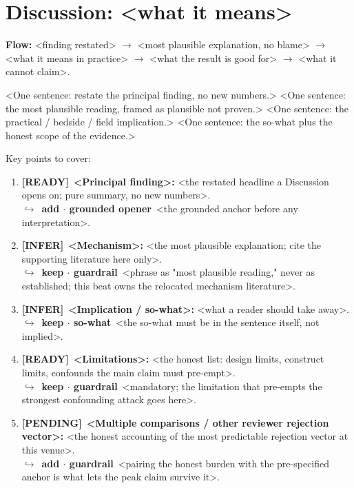 \documentclass[11pt]{article}
\newcommand{\rdy}{\textcolor{cReady}{\textbf{[READY]}}}   %
\newcommand{\pend}{\textcolor{cPend}{\textbf{[PENDING]}}} %
\newcommand{\infr}{\textcolor{cInfer}{\textbf{[INFER]}}}  %
\newcommand{\rev}[2]{\\{\footnotesize\color{gray}$\hookrightarrow$~\textbf{#1}~#2}}
\begin{document}
\section*{Discussion: <what it means>}

\noindent\textbf{Flow:} <finding restated> $\rightarrow$ <most plausible explanation, no blame> $\rightarrow$ <what it means in practice> $\rightarrow$ <what the result is good for> $\rightarrow$ <what it cannot claim>.

<One sentence: restate the principal finding, no new numbers.>
%
<One sentence: the most plausible reading, framed as plausible not proven.>
%
<One sentence: the practical / bedside / field implication.>
%
<One sentence: the so-what plus the honest scope of the evidence.>

Key points to cover:
\begin{enumerate}
\item \rdy~\textbf{<Principal finding>:} <the restated headline a Discussion opens on; pure summary, no new numbers>. \rev{add $\cdot$ grounded opener}{<the grounded anchor before any interpretation>.}
\item \infr~\textbf{<Mechanism>:} <the most plausible explanation; cite the supporting literature here only>. \rev{keep $\cdot$ guardrail}{<phrase as "most plausible reading," never as established; this beat owns the relocated mechanism literature>.}
\item \infr~\textbf{<Implication / so-what>:} <what a reader should take away>. \rev{keep $\cdot$ so-what}{<the so-what must be in the sentence itself, not implied>.}
\item \rdy~\textbf{<Limitations>:} <the honest list: design limits, construct limits, confounds the main claim must pre-empt>. \rev{keep $\cdot$ guardrail}{<mandatory; the limitation that pre-empts the strongest confounding attack goes here>.}
\item \pend~\textbf{<Multiple comparisons / other reviewer rejection vector>:} <the honest accounting of the most predictable rejection vector at this venue>. \rev{add $\cdot$ guardrail}{<pairing the honest burden with the pre-specified anchor is what lets the peak claim survive it>.}
\end{enumerate}

\bigskip
{}
\end{document}
